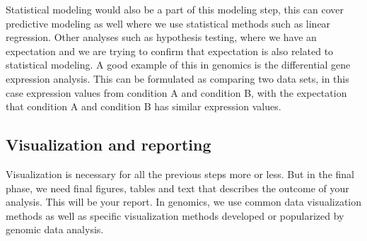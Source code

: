 Statistical modeling would also be a part of this modeling step, this can cover predictive modeling as well where we use statistical methods such as linear regression. Other analyses such as hypothesis testing, where we have an expectation and we are trying to confirm that expectation is also related to statistical modeling. A good example of this in genomics is the differential gene expression analysis. This can be formulated as comparing two data sets, in this case expression values from condition A and condition B, with the expectation that condition A and condition B has similar expression values\cite{edwards2013beginner}.

\subsection{Visualization and reporting} 
Visualization is necessary for all the previous steps more or less. But in the final phase, we need final figures, tables and text that describes the outcome of your analysis. This will be your report. In genomics, we use common data visualization methods as well as specific visualization methods developed or popularized by genomic data analysis. 
